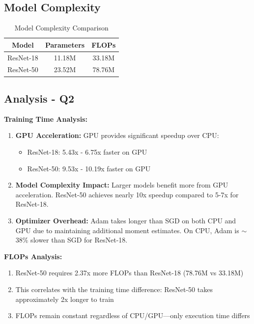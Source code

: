 \documentclass[11pt,a4paper]{article}
\begin{document}
\subsection{Model Complexity}

\begin{table}[H]
\centering
\caption{Model Complexity Comparison}
\begin{tabular}{|c|c|c|}
\hline
\textbf{Model} & \textbf{Parameters} & \textbf{FLOPs} \\
\hline
ResNet-18 & 11.18M & 33.18M \\
\hline
ResNet-50 & 23.52M & 78.76M \\
\hline
\end{tabular}
\end{table}

\subsection{Analysis - Q2}

\textbf{Training Time Analysis:}

\begin{enumerate}
    \item \textbf{GPU Acceleration:} GPU provides significant speedup over CPU:
    \begin{itemize}
        \item ResNet-18: 5.43x - 6.75x faster on GPU
        \item ResNet-50: 9.53x - 10.19x faster on GPU
    \end{itemize}
    
    \item \textbf{Model Complexity Impact:} Larger models benefit more from GPU acceleration. ResNet-50 achieves nearly 10x speedup compared to 5-7x for ResNet-18.
    
    \item \textbf{Optimizer Overhead:} Adam takes longer than SGD on both CPU and GPU due to maintaining additional moment estimates. On CPU, Adam is $\sim$38\% slower than SGD for ResNet-18.
\end{enumerate}

\textbf{FLOPs Analysis:}

\begin{enumerate}
    \item ResNet-50 requires 2.37x more FLOPs than ResNet-18 (78.76M vs 33.18M)
    \item This correlates with the training time difference: ResNet-50 takes approximately 2x longer to train
    \item FLOPs remain constant regardless of CPU/GPU—only execution time differs
\end{enumerate}
\end{document}

